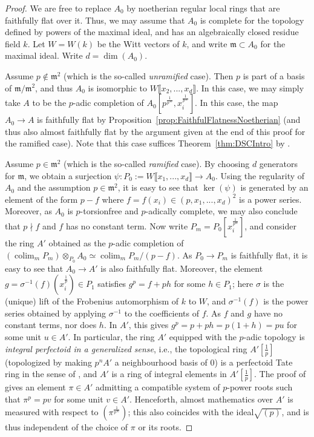 \documentclass[10pt,reqno]{amsart}
\newcommand{\colim}{\mathop{\mathrm{colim}}}
\begin{document}
\begin{proof}
We are free to replace $A_0$ by noetherian regular local rings that are faithfully flat over it. Thus, we may assume that $A_0$ is complete for the topology defined by powers of the maximal ideal, and has an algebraically closed residue field $k$. Let $W = W(k)$ be the Witt vectors of $k$, and write $\mathfrak{m} \subset A_0$ for the maximal ideal. Write $d = \dim(A_0)$.

Assume $p \notin \mathfrak{m}^2$ (which is the so-called {\em unramified} case). Then $p$ is part of a basis of $\mathfrak{m}/\mathfrak{m}^2$, and thus $A_0$ is isomorphic to $W \llbracket x_2,...,x_d \rrbracket$. In this case, we may simply take $A$ to be the $p$-adic completion of $A_0[p^{\frac{1}{p^\infty}},x_i^{\frac{1}{p^\infty}}]$. In this case, the map $A_0 \to A$ is faithfully flat by Proposition~\ref{prop:FaithfulFlatnessNoetherian} (and thus also almost faithfully flat by the argument given at the end of this proof for the ramified case). Note that this case suffices Theorem~\ref{thm:DSCIntro} by \cite[Theorem 6.1]{HochsterCanonical}.

Assume $p \in \mathfrak{m}^2$ (which is the so-called {\em ramified} case). By choosing $d$ generators for $\mathfrak{m}$, we obtain a surjection $\psi:P_0 := W \llbracket x_1,...,x_d \rrbracket \to A_0$. Using the regularity of $A_0$ and the assumption $p \in \mathfrak{m}^2$, it is easy to see that $\ker(\psi)$ is generated by an element of the form $p - f$ where $f = f(x_i) \in (p,x_1,...,x_d)^2$ is a power series. Moreover, as $A_0$ is $p$-torsionfree and $p$-adically complete, we may also conclude that $p \nmid f$ and $f$ has no constant term. Now write $P_m = P_0[x_i^{\frac{1}{p^m}}]$, and consider the ring $A'$ obtained as the $p$-adic completion of $(\colim_m P_m) \otimes_{P_0} A_0 \simeq \colim_m P_m/(p-f)$. As $P_0 \to P_m$ is faithfully flat, it is easy to see that $A_0 \to A'$ is also faithfully flat. Moreover, the element $g = \sigma^{-1}(f)(x_i^{\frac{1}{p}}) \in P_1$ satisfies $g^p = f + ph$ for some $h \in P_1$; here $\sigma$ is the (unique) lift of the Frobenius automorphism of $k$ to $W$, and $\sigma^{-1}(f)$ is the power series obtained by applying $\sigma^{-1}$ to the coefficients of $f$. As $f$ and $g$ have no constant terms, nor does $h$. In $A'$, this gives $g^p = p + ph = p(1+h) = pu$ for some unit $u \in A'$. In particular, the ring $A'$ equipped with the $p$-adic topology is {\em integral perfectoid in a generalized sense}, i.e., the topological ring $A'[\frac{1}{p}]$ (topologized by making $p^n A'$ a neighbourhood basis of $0$) is a perfectoid Tate ring in the sense of \cite[Definition 6.1.1]{ScholzeWeinsteinBerkeley}, and $A'$ is a ring of integral elements in $A'[\frac{1}{p}]$. The proof of \cite[see Lemma 6.2.2]{ScholzeWeinsteinBerkeley} gives an element $\pi \in A'$ admitting a compatible system of $p$-power roots such that $\pi^p = p v$ for some unit $v \in A'$. Henceforth, almost mathematics over $A'$ is measured with respect to $(\pi^{\frac{1}{p^\infty}})$; this also coincides with the ideal$\sqrt{(p)}$, and is thus independent of the choice of $\pi$ or its roots.


\end{proof}
\end{document}
